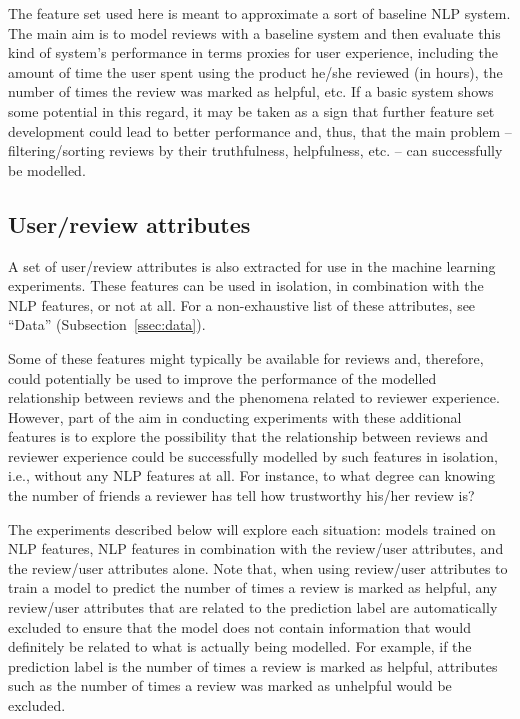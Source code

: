 \documentclass[9pt]{article}
\begin{document}
The feature set used here is meant to approximate a sort of baseline NLP system. The main aim is to model reviews with a baseline system and then evaluate this kind of system's performance in terms proxies for user experience, including the amount of time the user spent using the product he/she reviewed (in hours), the number of times the review was marked as helpful, etc. If a basic system shows some potential in this regard, it may be taken as a sign that further feature set development could lead to better performance and, thus, that the main problem -- filtering/sorting reviews by their truthfulness, helpfulness, etc. -- can successfully be modelled.

\subsection{User/review attributes}
\label{ssec:attributes}

A set of user/review attributes is also extracted for use in the machine learning experiments. These features can be used in isolation, in combination with the NLP features, or not at all. For a non-exhaustive list of these attributes, see ``Data'' (Subsection~\ref{ssec:data}).

Some of these features might typically be available for reviews and, therefore, could potentially be used to improve the performance of the modelled relationship between reviews and the phenomena related to reviewer experience. However, part of the aim in conducting experiments with these additional features is to explore the possibility that the relationship between reviews and reviewer experience could be successfully modelled by such features in isolation, i.e., without any NLP features at all. For instance, to what degree can knowing the number of friends a reviewer has tell how trustworthy his/her review is?

The experiments described below will explore each situation: models trained on NLP features, NLP features in combination with the review/user attributes, and the review/user attributes alone. Note that, when using review/user attributes to train a model to predict the number of times a review is marked as helpful, any review/user attributes that are related to the prediction label are automatically excluded to ensure that the model does not contain information that would definitely be related to what is actually being modelled. For example, if the prediction label is the number of times a review is marked as helpful, attributes such as the number of times a review was marked as unhelpful would be excluded.
\end{document}
